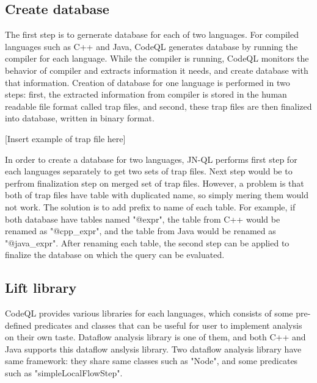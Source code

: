 \subsection{Create database}
The first step is to gernerate database for each of two languages.  For
compiled languages such as C++ and Java, CodeQL generates database by running
the compiler for each language. While the compiler is running, CodeQL monitors
the behavior of compiler and extracts information it needs, and create database
with that information.  Creation of database for one language is performed in
two steps: first, the extracted information from compiler is stored in the
human readable file format called trap files, and second, these trap files are
then finalized into database, written in binary format.

[Insert example of trap file here]

In order to create a database for two languages, JN-QL performs first step for
each languages separately to get two sets of trap files.  Next step would be to
perfrom finalization step on merged set of trap files. However, a problem is that
both of trap files have table with duplicated name, so simply mering them would not work.
The solution is to add prefix to name of each table. For example, if both
database have tables named "@expr", the table from C++ would be renamed as
"@cpp\_expr", and the table from Java would be renamed as "@java\_expr". After
renaming each table, the second step can be applied to finalize the database on
which the query can be evaluated.

\subsection{Lift library}
CodeQL provides various libraries for each languages, which consists of some
pre-defined predicates and classes that can be useful for user to implement
analysis on their own taste. Dataflow analysis library is one of them, and both
C++ and Java supports this dataflow anslysis library. Two dataflow analysis
library have same framework: they share same classes such as "Node", and some
predicates such as "simpleLocalFlowStep".

